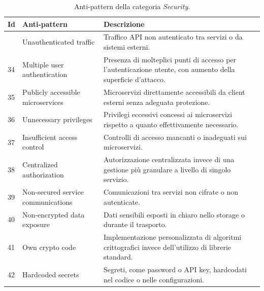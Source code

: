 \begin{table}[H]
\centering
\caption{Anti-pattern della categoria \textit{Security}.}
\label{tab:security}
\small
\renewcommand{\arraystretch}{1.15}
\setlength{\tabcolsep}{7pt}

\begin{tabularx}{\textwidth}{
>{\centering\arraybackslash}p{0.8cm}
>{\RaggedRight\arraybackslash}p{3.8cm}
>{\RaggedRight\arraybackslash}X
}
\toprule
\textbf{Id} & \textbf{Anti-pattern} & \textbf{Descrizione} \\
\midrule

33 & Unauthenticated traffic
& Traffico API non autenticato tra servizi o da sistemi esterni. \\

\addlinespace[0.3em]

34 & Multiple user authentication
& Presenza di molteplici punti di accesso per l’autenticazione utente, con aumento della superficie d’attacco. \\

\addlinespace[0.3em]

35 & Publicly accessible microservices
& Microservizi direttamente accessibili da client esterni senza adeguata protezione. \\

\addlinespace[0.3em]

36 & Unnecessary privileges
& Privilegi eccessivi concessi ai microservizi rispetto a quanto effettivamente necessario. \\

\addlinespace[0.3em]

37 & Insufficient access control
& Controlli di accesso mancanti o inadeguati sui microservizi. \\

\addlinespace[0.3em]

38 & Centralized authorization
& Autorizzazione centralizzata invece di una gestione più granulare a livello di singolo servizio. \\

\addlinespace[0.3em]

39 & Non-secured service communications
& Comunicazioni tra servizi non cifrate o non autenticate. \\

\addlinespace[0.3em]

40 & Non-encrypted data exposure
& Dati sensibili esposti in chiaro nello storage o durante il trasporto. \\

\addlinespace[0.3em]

41 & Own crypto code
& Implementazione personalizzata di algoritmi crittografici invece dell’utilizzo di librerie standard. \\

\addlinespace[0.3em]

42 & Hardcoded secrets
& Segreti, come password o API key, hardcodati nel codice o nelle configurazioni. \\

\bottomrule
\end{tabularx}
\end{table}
\normalsize

